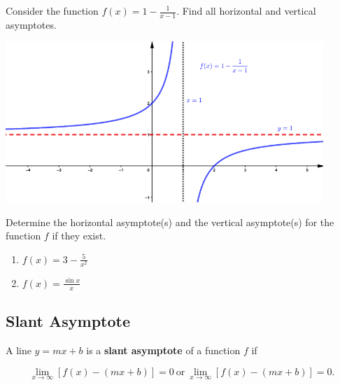 \begin{example}

Consider the function \(f(x)=1-\frac1{x-1}\). Find all horizontal and
vertical asymptotes.

\includegraphics[width=0.9\textwidth]{img/image-20200415104515572.png}

\end{example}
\vspace*{6\baselineskip}

\begin{example}

Determine the horizontal asymptote(s) and the vertical asymptote(s) for
the function \(f\) if they exist.

\begin{enumerate}
\item
  \(f(x)=3-\frac{5}{x^2}\)
\item
  \(f(x)=\frac{\sin x}{x}\)
\end{enumerate}

\end{example}

\hypertarget{slant-asymptote}{%
\subsection{Slant Asymptote}\label{slant-asymptote}}

\begin{definition}

A line \(y=mx+b\) is a \textbf{slant asymptote} of a function \(f\) if

\[\lim\limits_{x\to \infty}[f(x)-(mx+b)]=0  ~ \text{or} ~ \lim\limits_{x\to \infty}[f(x)-(mx+b)]=0.\]

\end{definition}



